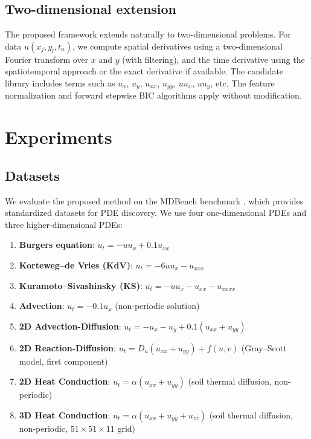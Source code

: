 \documentclass[preprint,12pt]{elsarticle}
\begin{document}
\subsection{Two-dimensional extension}
\label{sec:2d}

The proposed framework extends naturally to two-dimensional problems. For data $u(x_j, y_l, t_n)$, we compute spatial derivatives using a two-dimensional Fourier transform over $x$ and $y$ (with filtering), and the time derivative using the spatiotemporal approach or the exact derivative if available. The candidate library includes terms such as $u_x$, $u_y$, $u_{xx}$, $u_{yy}$, $u u_x$, $u u_y$, etc. The feature normalization and forward stepwise BIC algorithms apply without modification.

\section{Experiments}
\label{sec:experiments}

\subsection{Datasets}

We evaluate the proposed method on the MDBench benchmark \cite{ziaei2025mdbench}, which provides standardized datasets for PDE discovery. We use four one-dimensional PDEs and three higher-dimensional PDEs:

\begin{enumerate}
\item \textbf{Burgers equation}: $u_t = -u u_x + 0.1 u_{xx}$
\item \textbf{Korteweg--de Vries (KdV)}: $u_t = -6 u u_x - u_{xxx}$
\item \textbf{Kuramoto--Sivashinsky (KS)}: $u_t = -u u_x - u_{xx} - u_{xxxx}$
\item \textbf{Advection}: $u_t = -0.1 u_x$ (non-periodic solution)
\item \textbf{2D Advection-Diffusion}: $u_t = -u_x - u_y + 0.1(u_{xx} + u_{yy})$
\item \textbf{2D Reaction-Diffusion}: $u_t = D_u(u_{xx}+u_{yy}) + f(u,v)$ (Gray--Scott model, first component)
\item \textbf{2D Heat Conduction}: $u_t = \alpha(u_{xx}+u_{yy})$ (soil thermal diffusion, non-periodic)
\item \textbf{3D Heat Conduction}: $u_t = \alpha(u_{xx}+u_{yy}+u_{zz})$ (soil thermal diffusion, non-periodic, $51\times51\times11$ grid)
\end{enumerate}
\end{document}
